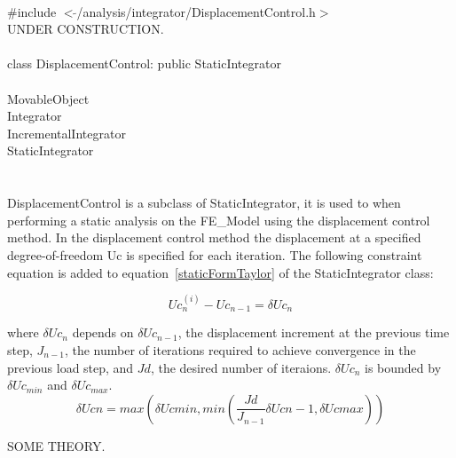 
   \\
\indent \#include $<\tilde{ }$/analysis/integrator/DisplacementControl.h$>$  \\

UNDER CONSTRUCTION.\\

  \\
\indent class DisplacementControl: public StaticIntegrator  \\

 \\
\indent MovableObject \\
\indent\indent Integrator \\
\indent\indent\indent IncrementalIntegrator \\
\indent\indent\indent\indent StaticIntegrator \\
\indent\indent\indent\indent{} \\

 \\ 
\indent DisplacementControl is a subclass of StaticIntegrator, it is
used to when performing a static analysis on the FE\_Model using the
displacement control method. In the displacement control method the
displacement at a specified degree-of-freedom Uc is specified for each
iteration. The following constraint equation is added to
equation~\ref{staticFormTaylor} of the StaticIntegrator class: 

\[ 
Uc_n^{(i)} - Uc_{n-1} = \delta Uc_n
\]

\noindent where $\delta Uc_n$ depends on $\delta Uc_{n-1}$,
the displacement increment at the previous time step, $J_{n-1}$,
the number of iterations required to achieve convergence in the
previous load step, and $Jd$, the desired number of iteraions. $\delta
Uc_n$ is bounded by $\delta Uc_{min}$  and $\delta Uc_{max}$. \\


\[ 
\delta Ucn = max \left( \delta Uc{min}, min \left(
\frac{Jd}{J_{n-1}} \delta Uc{n-1}, \delta Uc{max} \right) \right)
\]

SOME THEORY.\\

